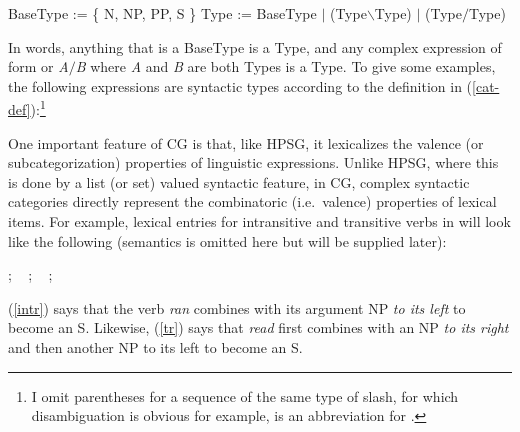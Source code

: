 \documentclass[output=paper
                ,modfonts
 	        ,biblatex
                ,babelshorthands
                ,newtxmath
                ,draftmode
                ,colorlinks, citecolor=brown
]{langscibook}
\begin{document}
\begin{exe}
 \ex\label{cat-def}
  \begin{xlist}
 \ex\label{bascat}
    BaseType := \{ N,  NP, PP, S \}
 \ex\label{complex-cat}
    Type := BaseType $|$ (Type\ensuremath{\backslash}Type) $|$ (Type\ensuremath{/}Type)
  \end{xlist}
\end{exe}
In words, anything that is a BaseType is a Type, and
any complex expression of form
  or
\textit{A}\ensuremath{/}\textit{B} where \textit{A} and \textit{B} are both
Types is a Type. To give some examples, the following expressions are
syntactic types according to the definition in
(\ref{cat-def}):\footnote{I omit
parentheses for a sequence of the same type of slash, for which
disambiguation is obvious \emdashUS for example,  is an abbreviation for .}

\begin{exe}
 \ex
  \begin{xlist}
 \ex
 \ex
 \ex
 \ex
  \end{xlist}
\end{exe}

One important feature of CG is that, like HPSG, it lexicalizes the
valence (or subcategorization) properties of linguistic expressions.
Unlike HPSG, where this is done by a list (or set) valued syntactic
feature, in CG, complex syntactic categories directly represent the
combinatoric (i.e.~valence) properties of lexical items. For example,
lexical entries for intransitive and transitive verbs in  will
look like the following (semantics is omitted here but will be
supplied later):

\begin{exe}
 \ex\label{lex1}
  \begin{xlist}
 \ex\label{intr}
    ; \  
 \ex\label{tr}
    ; \ 
 \ex\label{trthree}
    ; \ 
  \end{xlist}
\end{exe}
(\ref{intr}) says that the verb \textit{ran} combines with its argument NP \emph{to its
left} to become an S. Likewise, (\ref{tr}) says that \textit{read} first
combines with an NP \emph{to its right} and then another NP to its left to
become an S.
\end{document}
